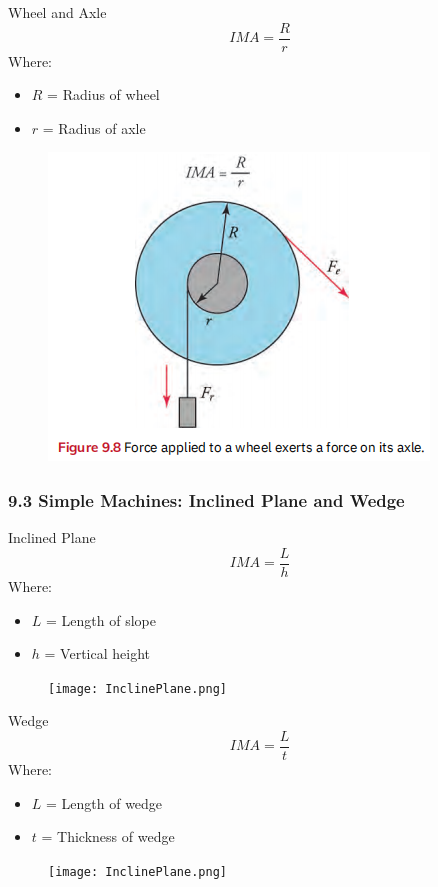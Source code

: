 \documentclass{beamer}
\begin{document}
\begin{frame}
\begin{block}{Wheel and Axle}
$$IMA = \frac{R}{r}$$
Where:
\begin{itemize}
\item $R$ = Radius of wheel
\item $r$ = Radius of axle
\end{itemize}
\end{block}
\begin{figure}
    \centering
    \includegraphics[width=0.5\linewidth]{Axle.png}
\end{figure}
\end{frame}

\begin{frame}
\frametitle{9.3 Simple Machines: Inclined Plane and Wedge}
\begin{block}{Inclined Plane}
$$IMA = \frac{L}{h}$$
Where:
\begin{itemize}
\item $L$ = Length of slope
\item $h$ = Vertical height
\end{itemize}
\end{block}
\begin{figure}
    \centering
    \texttt{[image: InclinePlane.png]}
\end{figure}

\end{frame}

\begin{frame}


\begin{block}{Wedge}
$$IMA = \frac{L}{t}$$
Where:
\begin{itemize}
\item $L$ = Length of wedge
\item $t$ = Thickness of wedge
\end{itemize}
\end{block}
\begin{figure}
    \centering
    \texttt{[image: InclinePlane.png]}
\end{figure}
\end{frame}
\end{document}
